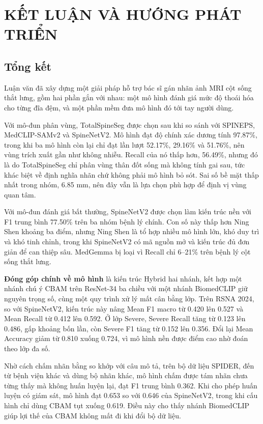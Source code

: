 \chapter{KẾT LUẬN VÀ HƯỚNG PHÁT TRIỂN}
\label{chap:conclusion}

\section{Tổng kết}

Luận văn đã xây dựng một giải pháp hỗ trợ bác sĩ gán nhãn ảnh MRI cột sống thắt lưng, gồm hai phần gắn với nhau: một mô hình đánh giá mức độ thoái hóa cho từng đĩa đệm, và một phần mềm đưa mô hình đó tới tay người dùng.

Với mô-đun phân vùng, TotalSpineSeg được chọn sau khi so sánh với SPINEPS, MedCLIP-SAMv2 và SpineNetV2. Mô hình đạt độ chính xác dương tính 97.87\%, trong khi ba mô hình còn lại chỉ đạt lần lượt 52.17\%, 29.16\% và 51.76\%, nên vùng trích xuất gần như không nhiễu. Recall của nó thấp hơn, 56.49\%, nhưng đó là do TotalSpineSeg chỉ phân vùng thân đốt sống mà không tính gai sau, tức khác biệt về định nghĩa nhãn chứ không phải mô hình bỏ sót. Sai số bề mặt thấp nhất trong nhóm, 6.85 mm, nên đây vẫn là lựa chọn phù hợp để định vị vùng quan tâm.

Với mô-đun đánh giá bất thường, SpineNetV2 được chọn làm kiến trúc nền với F1 trung bình 77.50\% trên ba nhóm bệnh lý chính. Con số này thấp hơn Ning Shen khoảng ba điểm, nhưng Ning Shen là tổ hợp nhiều mô hình lớn, khó duy trì và khó tinh chỉnh, trong khi SpineNetV2 có mã nguồn mở và kiến trúc đủ đơn giản để can thiệp sâu. MedGemma bị loại vì Recall chỉ 6--21\% trên bệnh lý cột sống thắt lưng.

\textbf{Đóng góp chính về mô hình} là kiến trúc Hybrid hai nhánh, kết hợp một nhánh chú ý CBAM trên ResNet-34 ba chiều với một nhánh BiomedCLIP giữ nguyên trọng số, cùng một quy trình xử lý mất cân bằng lớp. Trên RSNA 2024, so với SpineNetV2, kiến trúc này nâng Mean F1 macro từ 0.420 lên 0.527 và Mean Recall từ 0.412 lên 0.592. Ở lớp Severe, Severe Recall tăng từ 0.123 lên 0.486, gấp khoảng bốn lần, còn Severe F1 tăng từ 0.152 lên 0.356. Đổi lại Mean Accuracy giảm từ 0.810 xuống 0.724, vì mô hình nền được điểm cao nhờ đoán theo lớp đa số.

Nhờ cách chấm nhãn bằng so khớp với câu mô tả, trên bộ dữ liệu SPIDER, đến từ bệnh viện khác và dùng bộ nhãn khác, mô hình chấm được tám nhãn chưa từng thấy mà không huấn luyện lại, đạt F1 trung bình 0.362. Khi cho phép huấn luyện có giám sát, mô hình đạt 0.653 so với 0.646 của SpineNetV2, trong khi cấu hình chỉ dùng CBAM tụt xuống 0.619. Điều này cho thấy nhánh BiomedCLIP giúp lợi thế của CBAM không mất đi khi đổi bộ dữ liệu.

